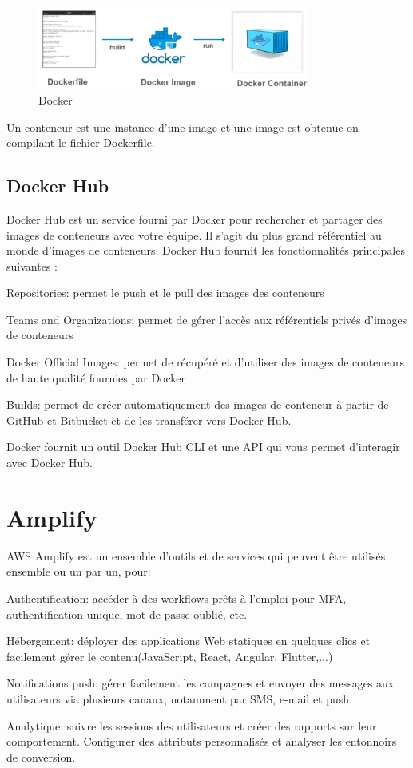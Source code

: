  \begin{figure}[!th]
            \centering
                \includegraphics[width=0.8\textwidth]{Figures/dockerfileimagecontainer}
	       \decoRule
		\caption[Docker]{Docker}
	\label{fig:docker}
\end{figure}
Un conteneur est une instance d'une image et une image est obtenue on compilant le fichier Dockerfile.
\subsection{Docker Hub}
Docker Hub est un service fourni par Docker pour rechercher et partager des images de conteneurs avec votre équipe. 
Il s'agit du plus grand référentiel au monde d'images de conteneurs.
Docker Hub fournit les fonctionnalités principales suivantes :
\begin{list}{•}
	\item Repositories: permet le push et le pull des images des conteneurs
	\item Teams and  Organizations: permet de gérer l'accès aux référentiels privés d'images de conteneurs
	\item Docker Official Images: permet de récupéré  et d'utiliser des images de conteneurs de haute qualité fournies par Docker
	\item Builds: permet de créer automatiquement des images de conteneur à partir de GitHub et Bitbucket et de les transférer vers Docker Hub.
\end{list}
Docker fournit un outil  Docker Hub CLI  et une API qui vous permet d'interagir avec Docker Hub.


\section{Amplify}

AWS Amplify est un ensemble d’outils et de services qui peuvent être utilisés ensemble ou un par un, pour:
\begin{list}{•}
\item Authentification: accéder à des workflows prêts à l'emploi pour MFA, authentification unique, mot de passe oublié, etc.
\item Hébergement: déployer des applications Web statiques en quelques clics et facilement gérer le contenu(JavaScript, React, Angular, Flutter,...)
\item Notifications push: gérer facilement les campagnes et envoyer des messages aux utilisateurs via plusieurs canaux, notamment par SMS, e-mail et push.
\item Analytique: suivre les sessions des utilisateurs et créer des rapports sur leur comportement. Configurer des attributs personnalisés et analyser les entonnoirs de conversion.
\end{list}

